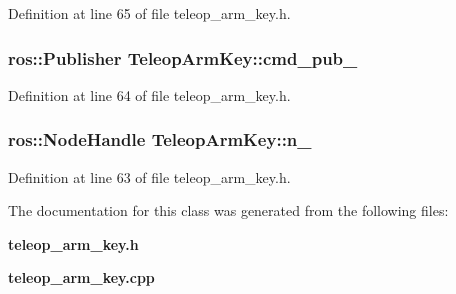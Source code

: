 \-Definition at line 65 of file teleop\-\_\-arm\-\_\-key.\-h.

\subsubsection[{cmd\-\_\-pub\-\_\-}]{\setlength{\rightskip}{0pt plus 5cm}ros\-::\-Publisher {\bf \-Teleop\-Arm\-Key\-::cmd\-\_\-pub\-\_\-}\hspace{0.3cm}{\ttfamily  [private]}}\label{classTeleopArmKey_a4af07ab0f477cee06bc8355376e9d6f8}


\-Definition at line 64 of file teleop\-\_\-arm\-\_\-key.\-h.

\subsubsection[{n\-\_\-}]{\setlength{\rightskip}{0pt plus 5cm}ros\-::\-Node\-Handle {\bf \-Teleop\-Arm\-Key\-::n\-\_\-}\hspace{0.3cm}{\ttfamily  [private]}}\label{classTeleopArmKey_a23af94e76d98494d2e2ee989179ee48d}


\-Definition at line 63 of file teleop\-\_\-arm\-\_\-key.\-h.



\-The documentation for this class was generated from the following files\-:\begin{DoxyCompactItemize}
\item 
{\bf teleop\-\_\-arm\-\_\-key.\-h}\item 
{\bf teleop\-\_\-arm\-\_\-key.\-cpp}\end{DoxyCompactItemize}

